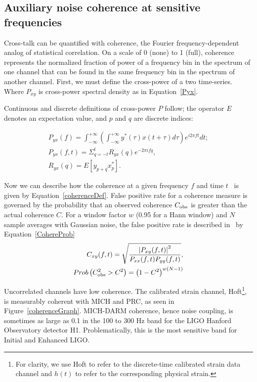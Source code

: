         \subsection{Auxiliary noise coherence at sensitive frequencies}
        \label{aux_noise}

	 Cross-talk can be quantified with coherence, the Fourier frequency-dependent analog of statistical correlation. On a scale of 0 (none) to 1 (full), coherence represents the normalized fraction of power of a frequency bin in the spectrum of one channel that can be found in the same frequency bin in the spectrum of another channel. First, we must define the cross-power of a two time-series. Where $P_{xy}$ is cross-power spectral density as in Equation~\ref{Pyx}.

	Continuous and discrete definitions of cross-power $P$ follow; the operator $E$ denotes an expectation value, and $p$ and $q$ are discrete indices:
 
            \begin{eqnarray}
            P_{yx} (f) = \int_{-\infty}^{+\infty} \left(\int_{-\infty}^{+\infty} y^{*} (\tau) x(t+\tau) d \tau \right) e^{i 2 \pi f t} dt; \label{Pyx} \\
            P_{yx} (f, t) = \Sigma_{q=-t}^{t} R_{yx} (q) e^{-2 \pi i f q}, \label{Pyxext} \\
            R_{yx} (q) = E\left[ y_{p+q} x_p^* \right] \label{crossCovar}.
            \end{eqnarray}

Now we can describe how the coherence at a given frequency $f$ and time $t$~\cite{Boashash1990} is given by Equation~\ref{coherenceDef}. False positive rate for a coherence measure is governed by the probability that an observed coherence $C_{\textup{obs}}$ is greater than the actual coherence $C$. For a window factor $w$ (0.95 for a Hann window) and $N$ sample averages with Gaussian noise, the false positive rate is described in~\cite{MendellCohere2013} by Equation~\ref{CohereProb}
\begin{eqnarray}
C_{xy}(f, t) = \sqrt{\frac{\left| P_{xy}(f, t) \right|^2}{P_{xx}(f, t) P_{yy} (f, t)}}\label{coherenceDef}, \\
Prob\left( C_{\textup{obs}}^2 > C^2\right) = \left(1-C^2\right)^{w(N-1)} \label{CohereProb}
\end{eqnarray}

Uncorrelated channels have low coherence. The calibrated strain channel, Hoft\footnote{For clarity, we use Hoft to refer to the discrete-time calibrated strain data channel and $h(t)$ to refer to the corresponding physical strain.}, is measurably coherent with MICH and PRC, as seen in Figure~\ref{coherenceGraph}. MICH-DARM coherence, hence noise coupling, is sometimes as large as 0.1 in the 100 to 300 Hz band for the LIGO Hanford Observatory detector H1. Problematically, this is the most sensitive band for Initial and Enhanced LIGO. 


